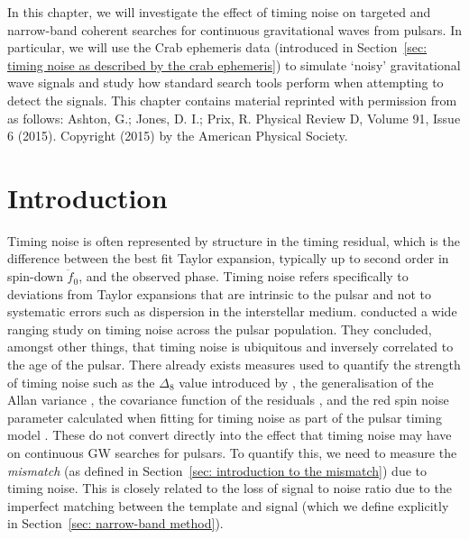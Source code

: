 \documentclass[../full_thesis/full_thesis.tex]{subfiles}
\begin{document}
In this chapter, we will investigate the effect of timing noise on targeted and
narrow-band coherent searches for continuous gravitational waves from pulsars.
In particular, we will use the Crab ephemeris data (introduced in
Section~\ref{sec: timing noise as described by the crab ephemeris}) to simulate
`noisy' gravitational wave signals and study how standard search tools perform
when attempting to detect the signals. This chapter contains material reprinted
with permission from \citet{Ashton2015} as follows: Ashton, G.; Jones, D. I.;
Prix, R. Physical Review D, Volume 91, Issue 6 (2015).  Copyright (2015) by the
American Physical Society.

\section{Introduction}
\label{sec: narrow-band introduction}

Timing noise is often represented by structure in the timing residual, which is
the difference between the best fit Taylor expansion, typically up to second
order in spin-down $\ddot{f}_0$, and the observed phase. Timing noise refers
specifically to deviations from Taylor expansions that are intrinsic to the
pulsar and not to systematic errors such as dispersion in the interstellar
medium.  \citet{Hobbs2010} conducted a wide ranging study on timing noise
across the pulsar population.  They concluded, amongst other things, that
timing noise is ubiquitous and inversely correlated to the age of the pulsar.
There already exists measures used to quantify the strength of timing noise
such as the $\Delta_{8}$ value introduced by \citet{Arzoumanian1994}, the
generalisation of the Allan variance \citep{Matsakis1997}, the covariance
function of the residuals \citep{Coles2011}, and the red spin noise parameter
calculated when fitting for timing noise as
part of the pulsar timing model \citep{Lentati2014}. These do not convert
directly into the effect that timing noise may have on continuous GW searches
for pulsars. To quantify this, we need to measure the \emph{mismatch} (as
defined in Section~\ref{sec: introduction to the mismatch}) due to
timing noise. 
This is closely related to the loss of signal to noise ratio due
to the imperfect matching between the template and signal (which we define
explicitly in Section~\ref{sec: narrow-band method}).
\end{document}

